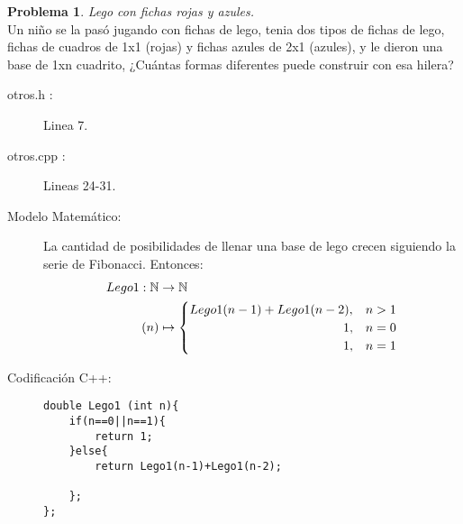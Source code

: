 \documentclass{article}
\theoremstyle{plain}
\theoremstyle{definition}
\newtheorem{problem}{Problema}
\begin{document}
\begin{problem} \emph{Lego con fichas rojas y azules.}\\
\hspace*{7mm}Un niño se la pasó jugando con fichas de lego, tenia dos tipos de fichas de lego, fichas de cuadros de 1x1 (rojas) y fichas azules de 2x1 (azules), y le dieron una base de 1xn cuadrito, ¿Cuántas formas diferentes puede construir con esa hilera?
\begin{description}
\item[otros.h :] Linea 7. \item[otros.cpp :] Lineas 24-31.

\item[Modelo Matemático:]
La cantidad de posibilidades de llenar una base de lego crecen siguiendo la serie de Fibonacci.
Entonces:
\begin{align*}
Lego1: \mathbb{N} &\to \mathbb{N}\\
(n) &\mapsto \begin{cases}
Lego1(n-1)+Lego1(n-2),&n>1\\
\hspace*{43mm}1,&n=0\\
\hspace*{43mm}1,&n=1\\
\end{cases}
\end{align*}
%
\item[Codificación \textsf{C++}:]\hfill
%
\begin{verbatim}
double Lego1 (int n){
    if(n==0||n==1){
        return 1;
    }else{
        return Lego1(n-1)+Lego1(n-2);

    };
};
\end{verbatim}
\end{description}
\end{problem}
\end{document}
